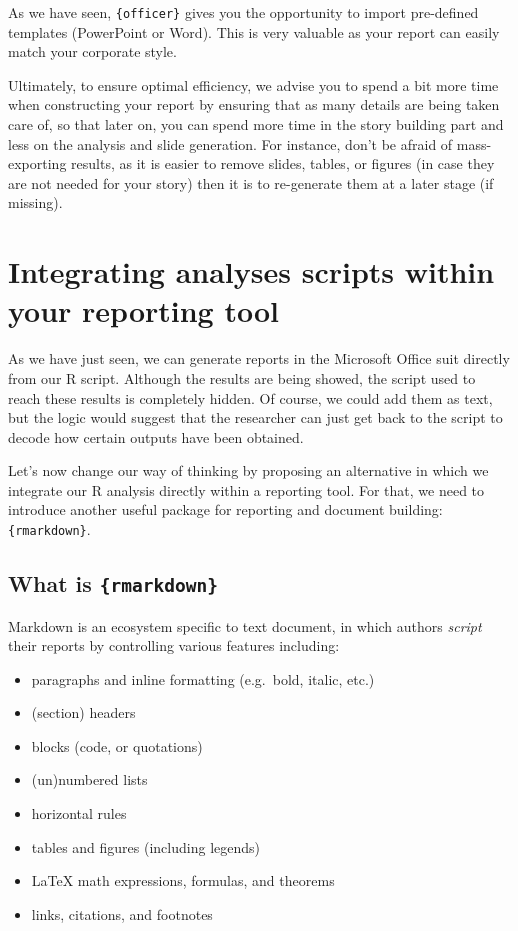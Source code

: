 \documentclass[
]{krantz}
\providecommand{\tightlist}{%
  \setlength{\itemsep}{0pt}\setlength{\parskip}{0pt}}
\begin{document}
As we have seen, \texttt{\{officer\}} gives you the opportunity to import pre-defined templates (PowerPoint or Word). This is very valuable as your report can easily match your corporate style.

Ultimately, to ensure optimal efficiency, we advise you to spend a bit more time when constructing your report by ensuring that as many details are being taken care of, so that later on, you can spend more time in the story building part and less on the analysis and slide generation. For instance, don't be afraid of mass-exporting results, as it is easier to remove slides, tables, or figures (in case they are not needed for your story) then it is to re-generate them at a later stage (if missing).

\hypertarget{integrating-analyses-scripts-within-your-reporting-tool}{%
\section{Integrating analyses scripts within your reporting tool}\label{integrating-analyses-scripts-within-your-reporting-tool}}

As we have just seen, we can generate reports in the Microsoft Office suit directly from our R script. Although the results are being showed, the script used to reach these results is completely hidden. Of course, we could add them as text, but the logic would suggest that the researcher can just get back to the script to decode how certain outputs have been obtained.

Let's now change our way of thinking by proposing an alternative in which we integrate our R analysis directly within a reporting tool. For that, we need to introduce another useful package for reporting and document building: \texttt{\{rmarkdown\}}.

\hypertarget{what-is-rmarkdown}{%
\subsection{\texorpdfstring{What is \texttt{\{rmarkdown\}}}{What is \{rmarkdown\}}}\label{what-is-rmarkdown}}

Markdown is an ecosystem specific to text document, in which authors \emph{script} their reports by controlling various features including:

\begin{itemize}
\tightlist
\item
  paragraphs and inline formatting (e.g.~bold, italic, etc.)
\item
  (section) headers
\item
  blocks (code, or quotations)
\item
  (un)numbered lists
\item
  horizontal rules
\item
  tables and figures (including legends)
\item
  LaTeX math expressions, formulas, and theorems
\item
  links, citations, and footnotes
\end{itemize}
\end{document}
